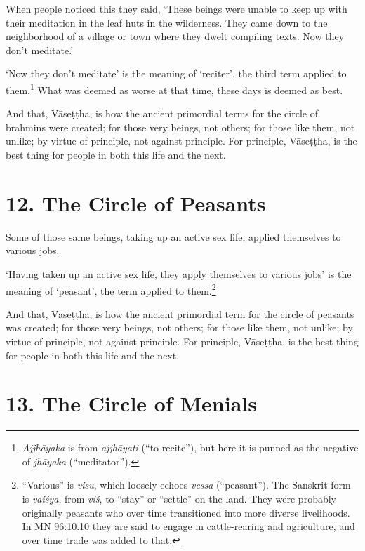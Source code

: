 \documentclass[12pt,openany]{book}%
\begin{document}
When people noticed this they said, ‘These beings were unable to keep up with their meditation in the leaf huts in the wilderness. They came down to the neighborhood of a village or town where they dwelt compiling texts. Now they don’t meditate.’ 

‘Now they don’t meditate’ is the meaning of ‘reciter’, the third term applied to them.\footnote{\textit{\textsanskrit{Ajjhāyaka}} is from \textit{\textsanskrit{ajjhāyati}} (“to recite”), but here it is punned as the negative of \textit{\textsanskrit{jhāyaka}} (“meditator”). } What was deemed as worse at that time, these days is deemed as best. 

And that, \textsanskrit{Vāseṭṭha}, is how the ancient primordial terms for the circle of brahmins were created; for those very beings, not others; for those like them, not unlike; by virtue of principle, not against principle. For principle, \textsanskrit{Vāseṭṭha}, is the best thing for people in both this life and the next. 

\section*{12. The Circle of Peasants }

Some of those same beings, taking up an active sex life, applied themselves to various jobs. 

‘Having taken up an active sex life, they apply themselves to various jobs’ is the meaning of ‘peasant’, the term applied to them.\footnote{“Various” is \textit{visu}, which loosely echoes \textit{vessa} (“peasant”). The Sanskrit form is \textit{\textsanskrit{vaiśya}}, from \textit{\textsanskrit{viś}}, to “stay” or “settle” on the land. They were probably originally peasants who over time transitioned into more diverse livelihoods. In \href{https://suttacentral.net/mn96/en/sujato\#10.10}{MN 96:10.10} they are said to engage in cattle-rearing and agriculture, and over time trade was added to that. } 

And that, \textsanskrit{Vāseṭṭha}, is how the ancient primordial term for the circle of peasants was created; for those very beings, not others; for those like them, not unlike; by virtue of principle, not against principle. For principle, \textsanskrit{Vāseṭṭha}, is the best thing for people in both this life and the next. 

\section*{13. The Circle of Menials }
\end{document}
